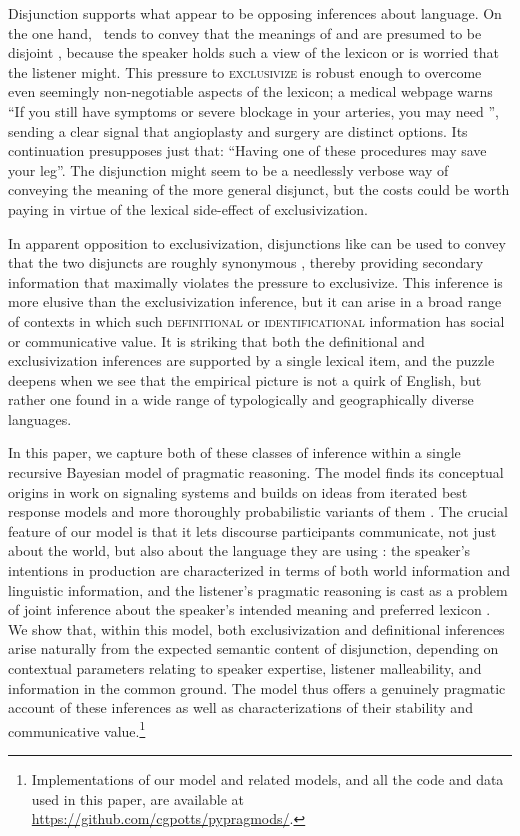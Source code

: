 \documentclass[12pt,twoside]{article}
\renewcommand{\_}{\textbf{\textunderscore\hspace{-4pt}\textunderscore\hspace{-3pt}\textunderscore\hspace{-4pt}\textunderscore}\hspace{0.5pt}}			%
\newcommand{\technicalTerm}[1]{\textsc{#1}}
\begin{document}
Disjunction supports what appear to be opposing inferences about
language. On the one hand, \XorY\ tends to convey that the meanings of
 and  are presumed to be disjoint
\citep{Hurford:1974}, because the speaker holds such a view of the
lexicon or is worried that the listener might. This pressure to
\technicalTerm{exclusivize} is robust enough to overcome even
seemingly non-negotiable aspects of the lexicon; a medical webpage
warns ``If you still have symptoms or severe blockage in your
arteries, you may need '', sending a
clear signal that angioplasty and surgery are distinct options. Its
continuation presupposes just that: ``Having one of these procedures
may save your leg''. The disjunction might seem to be a needlessly
verbose way of conveying the meaning of the more general disjunct, but
the costs could be worth paying in virtue of the lexical side-effect
of exclusivization.

In apparent opposition to exclusivization, disjunctions like
 can be used to convey that the two
disjuncts are roughly synonymous \citep{Horn89}, thereby providing
secondary information that maximally violates the pressure to
exclusivize. This inference is more elusive than the exclusivization
inference, but it can arise in a broad range of contexts in which such
\technicalTerm{definitional} or \technicalTerm{identificational}
information has social or communicative value. It is striking that
both the definitional and exclusivization inferences are supported by
a single lexical item, and the puzzle deepens when we see that the
empirical picture is not a quirk of English, but rather one found in a
wide range of typologically and geographically diverse languages.

In this paper, we capture both of these classes of inference within a
single recursive Bayesian model of pragmatic reasoning. The model
finds its conceptual origins in  work on signaling
systems and builds on ideas from iterated best response models
\citep{Jaeger:2007,Jaeger:2011,Franke09DISS} and more thoroughly
probabilistic variants of them
\citep{CamererHo:2004,Frank:Goodman:2012}. The crucial feature of our
model is that it lets discourse participants communicate, not just
about the world, but also about the language they are using
\citep{Bergen:Goodman:Levy:2012,bergen-levy-goodman:2014}: the
speaker's intentions in production are characterized in terms of both
world information and linguistic information, and the listener's
pragmatic reasoning is cast as a problem of joint inference about the
speaker's intended meaning and preferred lexicon
\citep{Smith:Goodman:Frank:2013}. We show that, within this model,
both exclusivization and definitional inferences arise naturally from
the expected semantic content of disjunction, depending on contextual
parameters relating to speaker expertise, listener malleability, and
information in the common ground. The model thus offers a genuinely
pragmatic account of these inferences as well as characterizations of
their stability and communicative value.\footnote{Implementations of
  our model and related models, and all the code and data used in this
  paper, are available at
  \url{https://github.com/cgpotts/pypragmods/}.}
\end{document}
